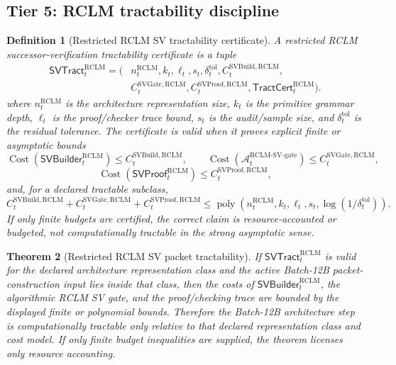 \documentclass[11pt,a4paper]{article}
\newtheorem{theorem}{Theorem}[section]
\newtheorem{definition}[theorem]{Definition}
\newcommand{\Acal}{\mathcal A}
\newcommand{\RCLM}{\mathrm{RCLM}}
\newcommand{\Cost}{\operatorname{Cost}}
\newcommand{\gate}{\mathrm{gate}}
\begin{document}
\subsection{Tier 5: RCLM tractability discipline}

\begin{definition}[Restricted RCLM SV tractability certificate]
\label{def:rclm-batch12b-sv-tractability-certificate}
A restricted RCLM successor-verification tractability certificate is a tuple
\[
\begin{aligned}
\mathsf{SVTract}_t^{\RCLM}
=(&n_t^{\RCLM},k_t,\ell_t,s_t,\delta_t^{\mathrm{tol}},
C_t^{\mathrm{SVBuild},\RCLM},\\
&C_t^{\mathrm{SVGate},\RCLM},
C_t^{\mathrm{SVProof},\RCLM},
\mathsf{TractCert}_t^{\RCLM}).
\end{aligned}
\]
where \(n_t^{\RCLM}\) is the architecture representation size, \(k_t\) is the primitive grammar depth, \(\ell_t\) is the proof/checker trace bound, \(s_t\) is the audit/sample size, and \(\delta_t^{\mathrm{tol}}\) is the residual tolerance. The certificate is valid when it proves explicit finite or asymptotic bounds
\[
\Cost(\mathsf{SVBuilder}_t^{\RCLM})\le C_t^{\mathrm{SVBuild},\RCLM},
\qquad
\Cost(\Acal_t^{\RCLM\text{-}\mathrm{SV}\text{-}\gate})\le C_t^{\mathrm{SVGate},\RCLM},
\]
\[
\Cost(\mathsf{SVProof}_t^{\RCLM})\le C_t^{\mathrm{SVProof},\RCLM},
\]
and, for a declared tractable subclass,
\[
C_t^{\mathrm{SVBuild},\RCLM}+C_t^{\mathrm{SVGate},\RCLM}+C_t^{\mathrm{SVProof},\RCLM}
\le
\operatorname{poly}(n_t^{\RCLM},k_t,\ell_t,s_t,\log(1/\delta_t^{\mathrm{tol}})).
\]
If only finite budgets are certified, the correct claim is resource-accounted or budgeted, not computationally tractable in the strong asymptotic sense.
\end{definition}

\begin{theorem}[Restricted RCLM SV packet tractability]
\label{thm:rclm-batch12b-restricted-sv-packet-tractability}
If \(\mathsf{SVTract}_t^{\RCLM}\) is valid for the declared architecture representation class and the active Batch-12B packet-construction input lies inside that class, then the costs of \(\mathsf{SVBuilder}_t^{\RCLM}\), the algorithmic RCLM SV gate, and the proof/checking trace are bounded by the displayed finite or polynomial bounds. Therefore the Batch-12B architecture step is computationally tractable only relative to that declared representation class and cost model. If only finite budget inequalities are supplied, the theorem licenses only resource accounting.
\end{theorem}
\end{document}
